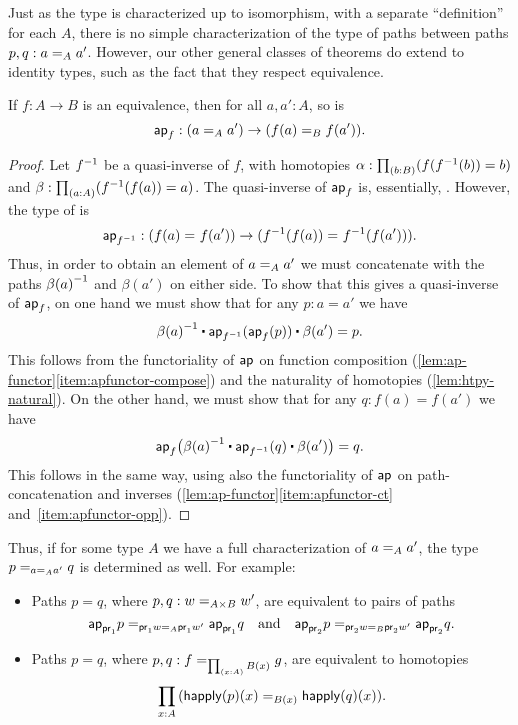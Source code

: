 Just as the type  is characterized up to isomorphism, with
a separate ``definition'' for each $A$, there is no simple
characterization of the type  of paths between
paths $p,q : \id[A]{a}{a'}$.
However, our other general classes of theorems do extend to identity types, such as the fact that they respect equivalence.

\begin{thm}\label{thm:paths-respects-equiv}
  If $f : A \to B$ is an equivalence, then for all $a,a':A$, so is
  \[\apfunc{f} : (\id[A]{a}{a'}) \to (\id[B]{f(a)}{f(a')}).\]
\end{thm}
\begin{proof}
  Let $\opp f$ be a quasi-inverse of $f$, with homotopies $\alpha:\prd{b:B} (f(\opp f(b))=b)$ and $\beta:\prd{a:A} (\opp f(f(a)) = a)$.
  The quasi-inverse of $\apfunc{f}$ is, essentially, .
  However, the type of  is
  \[\apfunc{\opp f} : (\id{f(a)}{f(a')}) \to (\id{\opp f(f(a))}{\opp f(f(a'))}).\]
  Thus, in order to obtain an element of $\id[A]{a}{a'}$ we must concatenate with the paths $\opp{\beta(a)}$ and $\beta (a')$ on either side.
  To show that this gives a quasi-inverse of $\apfunc{f}$, on one hand we must show that for any $p:a=a'$ we have
  \[ \opp{\beta(a)} \ct \apfunc{\opp f}(\apfunc{f}(p)) \ct \beta(a') = p. \]
  This follows from the functoriality of $\apfunc{}$ on function composition (\autoref{lem:ap-functor}\ref{item:apfunctor-compose}) and the naturality of homotopies (\autoref{lem:htpy-natural}).
  On the other hand, we must show that for any $q:f(a)=f(a')$ we have
  \[ \apfunc{f}\big( \opp{\beta(a)} \ct \apfunc{\opp f}(q) \ct \beta(a') \big) = q. \]
  This follows in the same way, using also the functoriality of $\apfunc{}$ on path-concatenation and inverses (\autoref{lem:ap-functor}\ref{item:apfunctor-ct} and~\ref{item:apfunctor-opp}).
\end{proof}

Thus, if for some type $A$ we have a full characterization of $\id[A]{a}{a'}$, the type $\id[{\id[A]{a}{a'}}]{p}{q}$ is determined as well.  
For example:
\begin{itemize}
\item Paths $p = q$, where $p,q : \id[A \times B]{w}{w'}$, are equivalent to pairs of paths
  \[\id[{\id[A]{\proj{1} w}{\proj{1} w'}}]{\projpath{1}{p}}{\projpath{1}{q}}
  \quad\text{and}\quad
  \id[{\id[B]{\proj{2} w}{\proj{2} w'}}]{\projpath{2}{p}}{\projpath{2}{q}}.
  \]
\item Paths $p = q$, where $p,q : \id[\prd{x:A} B(x)]{f}{g}$, are equivalent to homotopies
  \[\prd{x:A} (\id[B(x)] {\happly(p)(x)}{\happly(q)(x)}).\]
\end{itemize}

